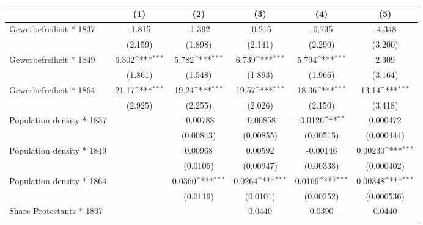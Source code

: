 {
\def\sym#1{\ifmmode^{#1}\else\(^{#1}\)\fi}
\begin{tabular}{l*{5}{c}}
\hline\hline
                    &\multicolumn{1}{c}{(1)}         &\multicolumn{1}{c}{(2)}         &\multicolumn{1}{c}{(3)}         &\multicolumn{1}{c}{(4)}         &\multicolumn{1}{c}{(5)}         \\
\hline
Gewerbefreiheit * 1837&      -1.815         &      -1.392         &      -0.215         &      -0.735         &      -4.348         \\
                    &     (2.159)         &     (1.898)         &     (2.141)         &     (2.290)         &     (3.200)         \\
Gewerbefreiheit * 1849&       6.302\sym{***}&       5.782\sym{***}&       6.739\sym{***}&       5.794\sym{***}&       2.309         \\
                    &     (1.861)         &     (1.548)         &     (1.893)         &     (1.966)         &     (3.164)         \\
Gewerbefreiheit * 1864&       21.17\sym{***}&       19.24\sym{***}&       19.57\sym{***}&       18.36\sym{***}&       13.14\sym{***}\\
                    &     (2.925)         &     (2.255)         &     (2.026)         &     (2.150)         &     (3.418)         \\
Population density * 1837&                     &    -0.00788         &    -0.00858         &     -0.0126\sym{**} &    0.000472         \\
                    &                     &   (0.00843)         &   (0.00855)         &   (0.00515)         &  (0.000444)         \\
Population density * 1849&                     &     0.00968         &     0.00592         &    -0.00146         &     0.00230\sym{***}\\
                    &                     &    (0.0105)         &   (0.00947)         &   (0.00338)         &  (0.000402)         \\
Population density * 1864&                     &      0.0360\sym{***}&      0.0264\sym{***}&      0.0169\sym{***}&     0.00348\sym{***}\\
                    &                     &    (0.0119)         &    (0.0101)         &   (0.00252)         &  (0.000536)         \\
Share Protestants * 1837&                     &                     &      0.0440         &      0.0390         &      0.0440         \\

\end{tabular}}
